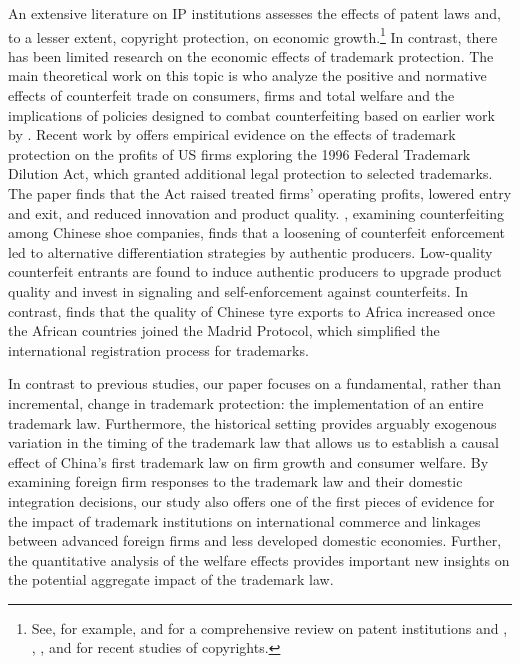 \documentclass[12pt]{article}
\begin{document}
An extensive literature on IP institutions assesses the effects of patent laws and, to a lesser extent, copyright protection, on economic growth.\footnote{See, for example, \citet{Moser2013} and \citet{Sampat2018} for a comprehensive review on patent institutions and \citet{BiasiMoser2018}, \citet{GiorcelliMoser2020}, \citet{OberholzerGeeStrumpf2007}, and \citet{LiMacGarvieMoser2018} for recent studies of copyrights.} In contrast, there has been limited research on the economic effects of trademark protection. The main theoretical work on this topic is \citet{GrossmanShapiro1988aer, GrossmanShapiro1988qje} who analyze the positive and normative effects of counterfeit trade on consumers, firms and total welfare and the implications of policies designed to combat counterfeiting based on earlier work by \citet{Shapiro1982,Shapiro1983}. Recent work by \citet{HeathMace2020} offers empirical evidence on the effects of trademark protection on the profits of US firms exploring the 1996 Federal Trademark Dilution Act, which granted additional legal protection to selected trademarks. The paper finds that the Act raised treated firms’ operating profits, lowered entry and exit, and reduced innovation and product quality. \citet{Qian2008}, examining counterfeiting among Chinese shoe companies, finds that a loosening of counterfeit enforcement led to alternative differentiation strategies by authentic producers. Low-quality counterfeit entrants are found to induce authentic producers to upgrade product quality and invest in signaling and self-enforcement against counterfeits. In contrast, \citet{Kuroishi2020} finds that the quality of Chinese tyre exports to Africa increased once the African countries joined the Madrid Protocol, which simplified the international registration process for trademarks. 

In contrast to previous studies, our paper focuses on a fundamental, rather than incremental, change in trademark protection: the implementation of an entire trademark law. Furthermore, the historical setting provides arguably exogenous variation in the timing of the trademark law that allows us to establish a causal effect of China's first trademark law on firm growth and consumer welfare. By examining foreign firm  responses to the trademark law and their domestic integration decisions, our study also offers one of the first pieces of evidence for the impact of trademark institutions on international commerce and linkages between advanced foreign firms and less developed domestic economies. Further, the quantitative analysis of the welfare effects provides important new insights on the potential aggregate impact of the trademark law.  %
\end{document}
